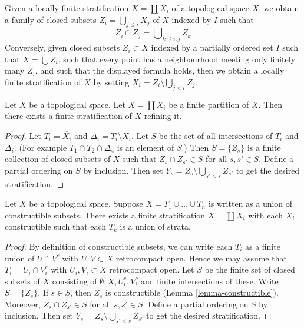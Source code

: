 \begin{remark}
\label{remark-locally-finite-stratification}
Given a locally finite stratification $X = \coprod X_i$ of a
topological space $X$, we obtain a family of closed subsets
$Z_i = \bigcup_{j \leq i} X_j$ of $X$ indexed by $I$ such that
$$
Z_i \cap Z_j = \bigcup\nolimits_{k \leq i, j} Z_k
$$
Conversely, given closed subsets $Z_i \subset X$ indexed by a partially
ordered set $I$ such that $X = \bigcup Z_i$, such that every point
has a neighbourhood meeting only finitely many $Z_i$, and such that
the displayed formula holds, then we obtain a locally finite
stratification of $X$ by setting $X_i = Z_i \setminus \bigcup_{j < i} Z_j$.
\end{remark}

\begin{lemma}
\label{lemma-partition-refined-by-stratification}
Let $X$ be a topological space. Let $X = \coprod X_i$ be a finite partition
of $X$. Then there exists a finite stratification of $X$ refining it.
\end{lemma}

\begin{proof}
Let $T_i = \overline{X_i}$ and $\Delta_i = T_i \setminus X_i$.
Let $S$ be the set of all intersections of $T_i$ and $\Delta_i$.
(For example $T_1 \cap T_2 \cap \Delta_4$ is an element of $S$.)
Then $S = \{Z_s\}$ is a finite collection of closed subsets of $X$ such that
$Z_s \cap Z_{s'} \in S$ for all $s, s' \in S$. Define a partial ordering
on $S$ by inclusion. Then set $Y_s = Z_s \setminus \bigcup_{s' < s} Z_{s'}$
to get the desired stratification.
\end{proof}

\begin{lemma}
\label{lemma-constructible-partition-refined-by-stratification}
Let $X$ be a topological space. Suppose $X = T_1 \cup \ldots \cup T_n$
is written as a union of constructible subsets. There exists a finite
stratification $X = \coprod X_i$ with each $X_i$ constructible
such that each $T_k$ is a union of strata.
\end{lemma}

\begin{proof}
By definition of constructible subsets, we can write each $T_i$ as a
finite union of $U \cap V^c$ with $U, V \subset X$ retrocompact open.
Hence we may assume that $T_i = U_i \cap V_i^c$
with $U_i, V_i \subset X$ retrocompact open. Let $S$ be the
finite set of closed subsets of $X$ consisting of
$\emptyset, X, U_i^c, V_i^c$ and finite intersections of these.
Write $S = \{Z_s\}$. If $s \in S$, then $Z_s$ is constructible
(Lemma \ref{lemma-constructible}).
Moreover, $Z_s \cap Z_{s'} \in S$ for all $s, s' \in S$.
Define a partial ordering on $S$ by inclusion. Then set
$Y_s = Z_s \setminus \bigcup_{s' < s} Z_{s'}$
to get the desired stratification.
\end{proof}

